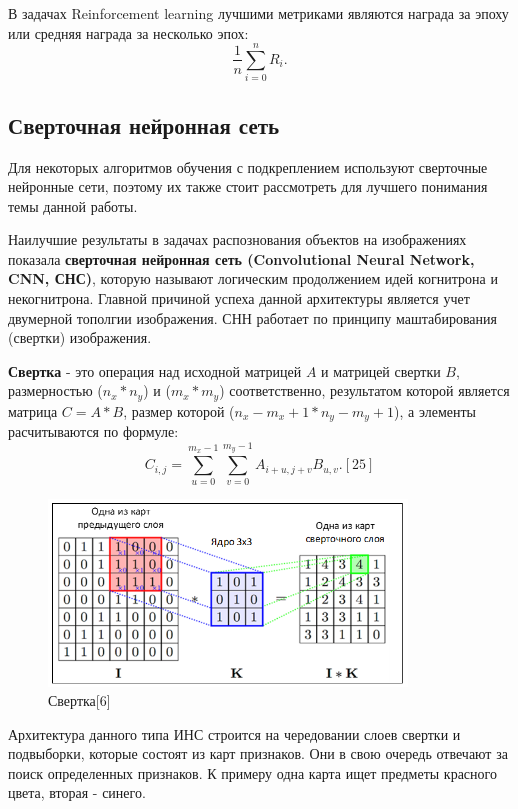 \documentclass[bachelor, och, coursework]{shiza}
\begin{document}
В задачах Reinforcement learning лучшими метриками являются награда за эпоху или средняя награда за несколько эпох:
\begin{equation}
    \frac{1}{n}\sum^n_{i = 0} R_i.
\end{equation}

\subsection{Сверточная нейронная сеть}

Для некоторых алгоритмов обучения с подкреплением используют сверточные нейронные сети, поэтому их также стоит рассмотреть для лучшего понимания темы данной работы.

Наилучшие результаты в задачах распознования объектов на изображениях показала \textbf{сверточная нейронная сеть (Convolutional Neural Network, CNN, СНС)}, 
которую называют логическим продолжением идей когнитрона и некогнитрона. Главной причиной успеха данной архитектуры является учет двумерной тополгии изображения.
СНН работает по принципу маштабирования (свертки) изображения.

\textbf{Свертка} - это операция над исходной матрицей $A$ и матрицей свертки $B$, размерностью  ($n_x * n_y$) и ($m_x * m_y$) соответственно, результатом которой является матрица $C = A * B$,
размер которой ($n_x - m_x + 1 * n_y - m_y + 1$), а элементы расчитываются по формуле:
\begin{equation}
    C_{i,j} = \sum\limits_{u=0}^{m_x-1}\sum\limits_{v=0}^{m_y-1}A_{i+u,j+v}B_{u,v}. [25]
\end{equation}

\begin{figure}[H]
    \centering
    \includegraphics[width=0.85\textwidth]{pic/6}
    \caption{Свертка[6]}
    \label{fig:img1}
\end{figure}

Архитектура данного типа ИНС строится на чередовании слоев свертки и подвыборки, которые состоят из карт признаков. Они в свою очередь отвечают за поиск определенных
признаков. К примеру одна карта ищет предметы красного цвета, вторая - синего.
\end{document}
